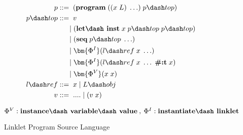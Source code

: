 \begin{figure}[!htbp]
    \centering
    \begin{align*}
    p           &::=\; (\textbf{program}\; ((x\; L)\; \ldots)\; p\dash top) \\
    p\dash top  &::=\; v \\
    \;          &\;\hspace*{1.4em}|\; (\textbf{let\dash inst}\; x\; p\dash top\;p\dash top) \\
    \;          &\;\hspace*{1.4em}|\; (\textbf{seq}\; p\dash top\; \ldots) \\
    \;          &\;\hspace*{1.4em}|\; \bm{\Phi^I}(l\dash ref\; x\; \ldots) \\
    \;          &\;\hspace*{1.4em}|\; \bm{\Phi^I}(l\dash ref\; x\; \ldots\; \textbf{\#:t}\; x) \\
    \;          &\;\hspace*{1.4em}|\; \bm{\Phi^V}(x\; x) \\
    l\dash ref &::=\; x\; |\; L\dash obj \\
    v           &::=\; ....\;|\;(v\;x) \\
    \end{align*}

    \vspace{-1em}

    \footnotesize $\Phi^V : \textbf{instance\dash variable\dash value}\:,\: \Phi^I : \textbf{instantiate\dash linklet}$
    \caption{Linklet Program Source Language}
    \label{fig:linklet-program-source-language}
\end{figure}